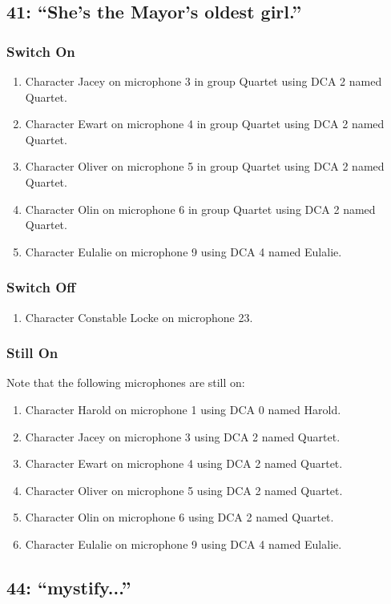 \subsection* {41: ``She's the Mayor's oldest girl.''}
\subsubsection* {Switch On}
\begin{enumerate}
\item Character Jacey on microphone 3 in group Quartet using DCA 2 named Quartet.
\item Character Ewart on microphone 4 in group Quartet using DCA 2 named Quartet.
\item Character Oliver on microphone 5 in group Quartet using DCA 2 named Quartet.
\item Character Olin on microphone 6 in group Quartet using DCA 2 named Quartet.
\item Character Eulalie on microphone 9 using DCA 4 named Eulalie.
\end{enumerate}
\subsubsection* {Switch Off}
\begin{enumerate}
\item Character Constable Locke on microphone 23.
\end{enumerate}
\subsubsection* {Still On}
Note that the following microphones are still on:
\begin{enumerate}
\item Character Harold on microphone 1 using DCA 0 named Harold.
\item Character Jacey on microphone 3 using DCA 2 named Quartet.
\item Character Ewart on microphone 4 using DCA 2 named Quartet.
\item Character Oliver on microphone 5 using DCA 2 named Quartet.
\item Character Olin on microphone 6 using DCA 2 named Quartet.
\item Character Eulalie on microphone 9 using DCA 4 named Eulalie.
\end{enumerate}
\subsection* {44: ``mystify...''}
